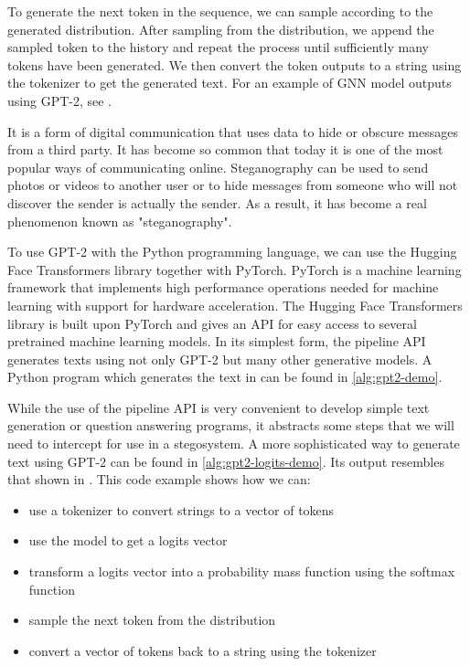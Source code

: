 To generate the next token in the sequence, we can sample according to the generated distribution.
After sampling from the distribution, we append the sampled token to the history and repeat the process until sufficiently many tokens have been generated.
We then convert the token outputs to a string using the tokenizer to get the generated text.
For an example of GNN model outputs using GPT-2, see .

\begin{example}
It is a form of digital communication that uses data to hide or obscure messages from a third party. It has become so common that today it is one of the most popular ways of communicating online. Steganography can be used to send photos or videos to another user or to hide messages from someone who will not discover the sender is actually the sender. As a result, it has become a real phenomenon known as "steganography".
  \label{example:gpt2-output-sample}
\end{example}

To use GPT-2 with the Python programming language, we can use the Hugging Face Transformers library together with PyTorch.
PyTorch \cite{PyTorch} is a machine learning framework that implements high performance operations needed for machine learning with support for hardware acceleration.
The Hugging Face Transformers library \cite{HFTransformers} is built upon PyTorch and gives an API for easy access to several pretrained machine learning models.
In its simplest form, the pipeline API generates texts using not only GPT-2 but many other generative models.
A Python program which generates the text in  can be found in \autoref{alg:gpt2-demo}.

While the use of the pipeline API is very convenient to develop simple text generation or question answering programs, it abstracts some steps that we will need to intercept for use in a stegosystem.
A more sophisticated way to generate text using GPT-2 can be found in \autoref{alg:gpt2-logits-demo}.
Its output resembles that shown in . 
This code example shows how we can:

\begin{itemize}
  \item use a tokenizer to convert strings to a vector of tokens
  \item use the model to get a logits vector
  \item transform a logits vector into a probability mass function using the softmax function
  \item sample the next token from the distribution
  \item convert a vector of tokens back to a string using the tokenizer
\end{itemize}

